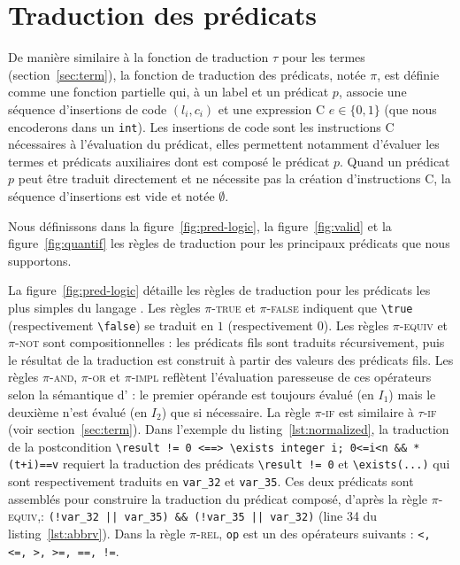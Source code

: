 \section{Traduction des prédicats \eacsl}
\label{sec:pred}


De manière similaire à la fonction de traduction $\tau$ pour les termes
(section~\ref{sec:term}), la fonction de traduction des prédicats, notée $\pi$,
est définie comme une fonction partielle qui, à un label et un prédicat \eacsl
$p$, associe une séquence d'insertions de code $(l_i, c_i)$ et une expression C
$e \in \{0, 1\}$ (que nous encoderons dans un \lstinline'int').
Les insertions de code sont les instructions C nécessaires à l'évaluation du
prédicat, elles permettent notamment d'évaluer les termes et prédicats
auxiliaires dont est composé le prédicat $p$.
Quand un prédicat $p$ peut être traduit directement et ne nécessite pas la
création d'instructions C, la séquence d'insertions est vide et notée
$\emptyset$.

Nous définissons dans la figure~\ref{fig:pred-logic}, la figure~\ref{fig:valid}
et la figure~\ref{fig:quantif} les règles de traduction pour les principaux
prédicats \eacsl que nous supportons.

La figure~\ref{fig:pred-logic} détaille les règles de traduction pour les
prédicats les plus simples du langage \eacsl.
Les règles \textsc{$\pi$-true} et \textsc{$\pi$-false} indiquent que
\lstinline'\true' (respectivement \lstinline'\false') se traduit en $1$
(respectivement $0$).
Les règles \textsc{$\pi$-equiv} et \textsc{$\pi$-not} sont compositionnelles :
les prédicats fils sont traduits récursivement, puis le résultat de la
traduction est construit à partir des valeurs des prédicats fils.
Les règles \textsc{$\pi$-and}, \textsc{$\pi$-or} et \textsc{$\pi$-impl}
reflètent l'évaluation paresseuse de ces opérateurs selon la sémantique d'\eacsl
: le premier opérande est toujours évalué (en $I_1$) mais le deuxième n'est
évalué (en $I_2$) que si nécessaire.
La règle \textsc{$\pi$-if} est similaire à \textsc{$\tau$-if} (voir
section~\ref{sec:term}).
Dans l'exemple du listing~\ref{lst:normalized}, la traduction de la
postcondition
\lstinline{\result != 0 <==> \exists integer i; 0<=i<n && *(t+i)==v} requiert
la traduction des prédicats \lstinline|\result != 0| et
\lstinline{\exists(...)} qui sont respectivement traduits en \lstinline|var_32|
et \lstinline|var_35|.
Ces deux prédicats sont assemblés pour construire la traduction du prédicat
composé, d'après la règle \textsc{$\pi$-equiv},:
\lstinline{(!var_32 || var_35) && (!var_35 || var_32)} (line 34 du
listing~\ref{lst:abbrv}).
Dans la règle \textsc{$\pi$-rel}, \lstinline|op| est un des opérateurs suivants
: \lstinline[style=c]{<, <=, >, >=, ==, !=}.

